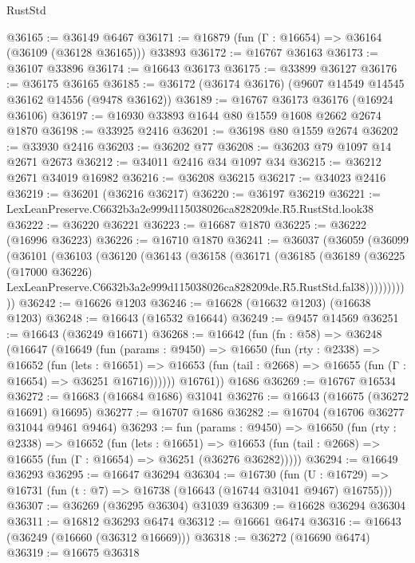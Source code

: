 \begin{lexlean}{RustStd}
\begin{coremodule}
@36165 := @36149 @6467
@36171 := @16879 (fun (Γ : @16654) => @36164 (@36109 (@36128 @36165))) @33893
@36172 := @16767 @36163
@36173 := @36107 @33896
@36174 := @16643 @36173
@36175 := @33899 @36127
@36176 := @36175 @36165
@36185 := @36172 (@36174 @36176) (@9607 @14549 @14545 @36162 @14556 (@9478 @36162))
@36189 := @16767 @36173 @36176 (@16924 @36106)
@36197 := @16930 @33893 @1644 @80 @1559 @1608 @2662 @2674 @1870
@36198 := @33925 @2416
@36201 := @36198 @80 @1559 @2674
@36202 := @33930 @2416
@36203 := @36202 @77
@36208 := @36203 @79 @1097 @14 @2671 @2673
@36212 := @34011 @2416 @34 @1097 @34
@36215 := @36212 @2671 @34019 @16982
@36216 := @36208 @36215
@36217 := @34023 @2416
@36219 := @36201 (@36216 @36217)
@36220 := @36197 @36219
@36221 := LexLeanPreserve.C6632b3a2e999d115038026ca828209de.R5.RustStd.look38
@36222 := @36220 @36221
@36223 := @16687 @1870
@36225 := @36222 (@16996 @36223)
@36226 := @16710 @1870
@36241 := @36037
    (@36059
      (@36099
        (@36101
          (@36103
            (@36120
              (@36143
                (@36158
                  (@36171
                    (@36185
                      (@36189
                        (@36225
                          (@17000 @36226)
                          LexLeanPreserve.C6632b3a2e999d115038026ca828209de.R5.RustStd.fal38)))))))))))
@36242 := @16626 @1203
@36246 := @16628 (@16632 @1203) (@16638 @1203)
@36248 := @16643 (@16532 @16644)
@36249 := @9457 @14569
@36251 := @16643 (@36249 @16671)
@36268 := @16642
    (fun (fn : @58) =>
    @36248
      (@16647
        (@16649
          (fun (params : @9450) =>
          @16650
            (fun (rty : @2338) =>
            @16652
              (fun (lets : @16651) =>
              @16653 (fun (tail : @2668) => @16655 (fun (Γ : @16654) => @36251 @16716))))))
        @16761))
    @1686
@36269 := @16767 @16534
@36272 := @16683 (@16684 @1686) @31041
@36276 := @16643 (@16675 (@36272 @16691) @16695)
@36277 := @16707 @1686
@36282 := @16704 (@16706 @36277 @31044 @9461 @9464)
@36293 := fun (params : @9450) =>
  @16650
    (fun (rty : @2338) =>
    @16652
      (fun (lets : @16651) =>
      @16653 (fun (tail : @2668) => @16655 (fun (Γ : @16654) => @36251 (@36276 @36282)))))
@36294 := @16649 @36293
@36295 := @16647 @36294
@36304 := @16730
    (fun (U : @16729) => @16731 (fun (t : @7) => @16738 (@16643 (@16744 @31041 @9467) @16755)))
@36307 := @36269 (@36295 @36304) @31039
@36309 := @16628 @36294 @36304
@36311 := @16812 @36293 @6474
@36312 := @16661 @6474
@36316 := @16643 (@36249 (@16660 (@36312 @16669)))
@36318 := @36272 (@16690 @6474)
@36319 := @16675 @36318

\end{coremodule}
\end{lexlean}
